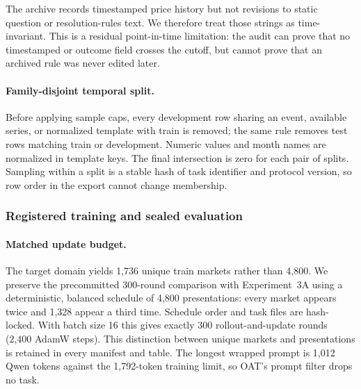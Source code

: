 The archive records timestamped price history but not revisions to static question
or resolution-rules text. We therefore treat those strings as time-invariant. This
is a residual point-in-time limitation: the audit can prove that no timestamped or
outcome field crosses the cutoff, but cannot prove that an archived rule was never
edited later.

\paragraph{Family-disjoint temporal split.}
Before applying sample caps, every development row sharing an event, available
series, or normalized template with train is removed; the same rule removes test
rows matching train or development. Numeric values and month names are normalized
in template keys. The final intersection is zero for each pair of splits. Sampling
within a split is a stable hash of task identifier and protocol version, so row
order in the export cannot change membership.

\subsubsection{Registered training and sealed evaluation}

\paragraph{Matched update budget.}
The target domain yields 1,736 unique train markets rather than 4,800. We preserve
the precommitted 300-round comparison with Experiment~3A using a deterministic,
balanced schedule of 4,800 presentations: every market appears twice and 1,328
appear a third time. Schedule order and task files are hash-locked. With batch size
16 this gives exactly 300 rollout-and-update rounds (2,400 AdamW steps). This distinction between unique markets and
presentations is retained in every manifest and table. The longest wrapped prompt
is 1,012 Qwen tokens against the 1,792-token training limit, so OAT's prompt filter
drops no task.

